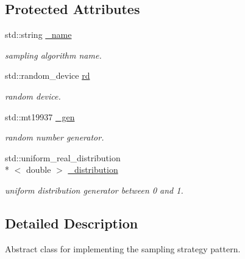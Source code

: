 \subsection*{Protected Attributes}
\begin{DoxyCompactItemize}
\item 
\hypertarget{classSampling_a42167134f19c2ad42aa796538356a7f8}{std\-::string \hyperlink{classSampling_a42167134f19c2ad42aa796538356a7f8}{\-\_\-name}}\label{classSampling_a42167134f19c2ad42aa796538356a7f8}

\begin{DoxyCompactList}\small\item\em sampling algorithm name. \end{DoxyCompactList}\item 
\hypertarget{classSampling_a77715cbe9a03102aa672fd34c776f042}{std\-::random\-\_\-device \hyperlink{classSampling_a77715cbe9a03102aa672fd34c776f042}{rd}}\label{classSampling_a77715cbe9a03102aa672fd34c776f042}

\begin{DoxyCompactList}\small\item\em random device. \end{DoxyCompactList}\item 
\hypertarget{classSampling_a696ac24b511359adaf2298c19b0d5883}{std\-::mt19937 \hyperlink{classSampling_a696ac24b511359adaf2298c19b0d5883}{\-\_\-gen}}\label{classSampling_a696ac24b511359adaf2298c19b0d5883}

\begin{DoxyCompactList}\small\item\em random number generator. \end{DoxyCompactList}\item 
\hypertarget{classSampling_a7dbb70549c2a72232358578f82173af7}{std\-::uniform\-\_\-real\-\_\-distribution\\*
$<$ double $>$ \hyperlink{classSampling_a7dbb70549c2a72232358578f82173af7}{\-\_\-distribution}}\label{classSampling_a7dbb70549c2a72232358578f82173af7}

\begin{DoxyCompactList}\small\item\em uniform distribution generator between 0 and 1. \end{DoxyCompactList}\end{DoxyCompactItemize}


\subsection{Detailed Description}
Abstract class for implementing the sampling strategy pattern. 

